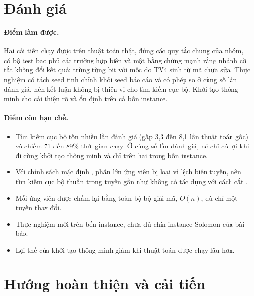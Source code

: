 \section{Đánh giá}

\paragraph{Điểm làm được.} Hai cải tiến chạy được trên thuật toán thật, đúng các quy tắc chung của nhóm, có
bộ test bao phủ các trường hợp biên và một bằng chứng mạnh rằng nhánh cờ tắt không đổi kết quả: trùng từng
bit với mốc do TV4 sinh từ mã chưa sửa. Thực nghiệm có tách seed tinh chỉnh khỏi seed báo cáo và có phép so
ở cùng số lần đánh giá, nên kết luận không bị thiên vị cho tìm kiếm cục bộ. Khởi tạo thông minh cho cải
thiện rõ và ổn định trên cả bốn instance.

\paragraph{Điểm còn hạn chế.}
\begin{itemize}
  \item Tìm kiếm cục bộ tốn nhiều lần đánh giá (gấp 3,3 đến 8,1 lần thuật toán gốc) và chiếm 71 đến 89\%
        thời gian chạy. Ở cùng số lần đánh giá, nó chỉ có lợi khi đi cùng khởi tạo thông minh và chỉ trên
        hai trong bốn instance.
  \item Với chính sách mặc định , phần lớn ứng viên bị loại vì lệch biên tuyến, nên tìm kiếm
        cục bộ thuần trong tuyến gần như không có tác dụng với cách cắt .
  \item Mỗi ứng viên được chấm lại bằng toàn bộ bộ giải mã, $O(n)$, dù chỉ một tuyến thay đổi.
  \item Thực nghiệm mới trên bốn instance, chưa đủ chín instance Solomon của bài báo.
  \item Lợi thế của khởi tạo thông minh giảm khi thuật toán được chạy lâu hơn.
\end{itemize}

\section{Hướng hoàn thiện và cải tiến}


